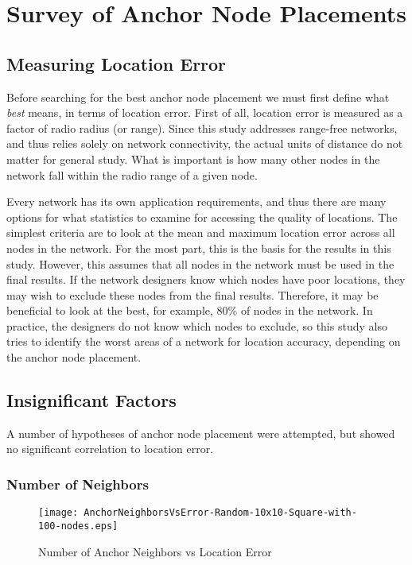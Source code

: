 \chapter{Survey of Anchor Node Placements}

\section{Measuring Location Error}
Before searching for the best anchor node placement we must first define what \emph{best} means, in terms of location error.  First of all, location error is measured as a factor of radio radius (or range).  Since this study addresses range-free networks, and thus relies solely on network connectivity, the actual units of distance do not matter for general study.  What is important is how many other nodes in the network fall within the radio range of a given node.  

Every network has its own application requirements, and thus there are many options for what statistics to examine for accessing the quality of locations.  The simplest criteria are to look at the mean and maximum location error across all nodes in the network.  For the most part, this is the basis for the results in this study.  However, this assumes that all nodes in the network must be used in the final results.  If the network designers know which nodes have poor locations, they may wish to exclude these nodes from the final results.  Therefore, it may be beneficial to look at the best, for example, 80\% of nodes in the network.  In practice, the designers do not know which nodes to exclude, so this study also tries to identify the worst areas of a network for location accuracy, depending on the anchor node placement.  

\section{Insignificant Factors}
A number of hypotheses of anchor node placement were attempted, but showed no significant correlation to location error.  

\subsection{Number of Neighbors}
\begin{figure}
  \centering
    \texttt{[image: AnchorNeighborsVsError-Random-10x10-Square-with-100-nodes.eps]}
    \caption{Number of Anchor Neighbors vs Location Error}
    \label{fig:Neighbors1}
\end{figure}

